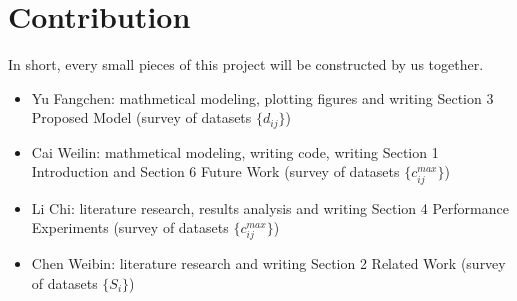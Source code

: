\section{Contribution}

In short, every small pieces of this project will be constructed by us together.
\begin{itemize}
    \item Yu Fangchen: mathmetical modeling, plotting figures and writing Section 3 Proposed Model (survey of datasets $\{d_{ij}\}$) 
    \item Cai Weilin: mathmetical modeling, writing code, writing Section 1 Introduction and Section 6 Future Work (survey of datasets $\{c_{ij}^{max}\}$) 
    \item Li Chi: literature research, results analysis and writing Section 4 Performance Experiments (survey of datasets $\{c_{ij}^{max}\}$) 
    \item Chen Weibin: literature research and writing Section 2 Related Work (survey of datasets $\{S_i\}$) 
\end{itemize}
